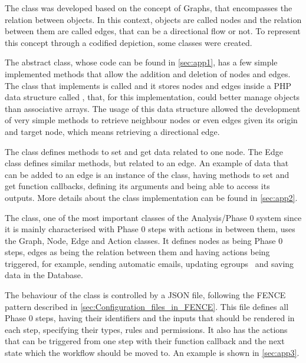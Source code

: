 
The  class was developed based on the concept of Graphs, that encompasses the relation between objects. In this context, objects are called nodes and the relation between them are called edges, that can be a directional flow or not. To represent this concept through a codified depiction, some classes were created.

The abstract  class, whose code can be found in \cref{sec:app1}, has a few simple implemented methods that allow the addition and deletion of nodes and edges.
The class that implements  is called  and it stores nodes and edges inside a PHP data structure called , that, for this implementation, could better manage objects than associative arrays.
The usage of this data structure allowed the development of very simple methods to retrieve neighbour nodes or even edges given its origin and target node, which means retrieving a directional edge.

The  class defines methods to set and get data related to one node. The Edge class defines similar methods, but related to an edge. An example of data that can be added to an edge is an instance of the  class, having methods to set and get function callbacks, defining its arguments and being able to access its outputs.
More details about the  class implementation can be found in \cref{sec:app2}.

The  class, one of the most important classes of the Analysis/Phase 0 system since it is mainly characterised with Phase 0 steps with actions in between them, uses the Graph, Node, Edge and Action classes. It defines nodes as being Phase 0 steps, edges as being the relation between them and having actions being triggered, for example, sending automatic emails, updating egroups~\cite{egroups} and saving data in the Database.

The behaviour of the  class is controlled by a JSON file, following the FENCE pattern described in \cref{sec:Configuration_files_in_FENCE}.
This file defines all Phase 0 steps, having their identifiers and the inputs that should be rendered in each step, specifying their types, rules and permissions.
It also has the actions that can be triggered from one step with their function callback and the next state which the workflow should be moved to. An example is shown in \cref{sec:app3}.

